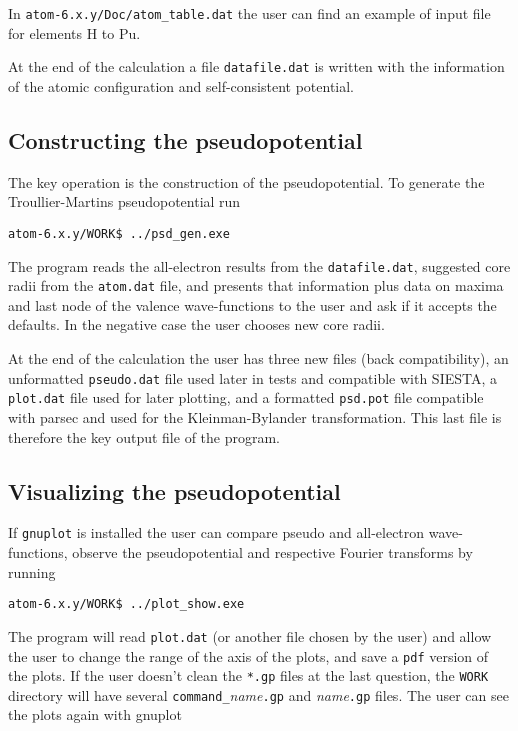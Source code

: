 \documentclass[11pt]{article}
\begin{document}
In \texttt{atom-6.x.y/Doc/atom{\_}table.dat} the user can find an example of input file for elements H to Pu.

At the end of the calculation a file \texttt{datafile.dat} is written with the information of the
atomic configuration and self-consistent potential.


\subsection{Constructing the pseudopotential}
\label{sec:run-psd}

The key operation is the construction of the pseudopotential.  To generate the Troullier-Martins
pseudopotential run

\noindent\texttt{atom-6.x.y/WORK\$ ../psd{\_}gen.exe}

The program reads the all-electron results from the \texttt{datafile.dat}, suggested core radii from the
\texttt{atom.dat} file, and presents that information plus data on maxima and last node of the
valence wave-functions to the user and ask if it accepts the defaults.  In the negative case the user
chooses new core radii.

At the end of the calculation the user has three new files (back compatibility), an unformatted
\texttt{pseudo.dat} file used later in tests and compatible with SIESTA,
a \texttt{plot.dat} file used for later plotting, and
a formatted \texttt{psd.pot} file compatible with parsec and used for the Kleinman-Bylander transformation.
This last file is therefore the key output file of the program.


\subsection{Visualizing the pseudopotential}
\label{sec:run-show}

If \texttt{gnuplot} is installed the user can compare pseudo and all-electron wave-functions,
observe the pseudopotential and respective Fourier transforms by running

\noindent\texttt{atom-6.x.y/WORK\$ ../plot{\_}show.exe}

The program will read \texttt{plot.dat} (or another file chosen by the user) and allow
the user to change the range of the axis of the plots, and save a \texttt{pdf} version of
the plots.  If the user doesn't clean the \texttt{*.gp} files at the last question,
the \texttt{WORK} directory will have several \texttt{command{\_}}{\it name}\texttt{.gp} and
{\it name}\texttt{.gp} files.  The user can see the plots again with gnuplot
\end{document}
